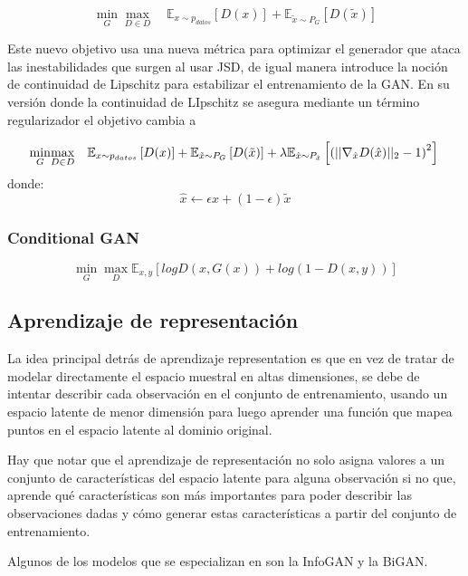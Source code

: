 \begin{equation}
	\label{eq:WGANobjective}
	\underset{G}{\min}\underset{D \in D}{\max}\quad \mathbb{E}_{x \sim  p_{datos}}\left[ D (x) \right] + \mathbb{E}_{\tilde{x}\sim P_{G}}\left[ D(\tilde{x})\right]
\end{equation}

Este nuevo objetivo usa una nueva métrica para optimizar el generador que ataca las inestabilidades que surgen al usar JSD, de igual manera introduce la noción de continuidad de Lipschitz para estabilizar el entrenamiento de la GAN. En su versión donde la continuidad de LIpschitz se asegura mediante un término regularizador el objetivo cambia a

\begin{equation}
	\underset{G}{\min}\underset{D \in D}{\max}\quad \mathbb{E}_{x \sim  p_{datos}}\left[ D (x) \right] + \mathbb{E}_{\tilde{x}\sim P_{G}}\left[ D(\tilde{x})\right] + \lambda \mathbb{E}_{\hat{x}\sim P_{\hat{x}}}\left[ \left( || \nabla_{\hat{x}}D(\hat{x})||_{2} - 1\right) ^2 \right]\\
\end{equation}
\qquad\qquad donde:
\[
	\hat{x} \leftarrow \epsilon x + (1 - \epsilon) \tilde{x}
\]

\subsubsection{Conditional GAN}

\begin{equation}
	\label{eq:CGANobjective}
	\underset{G}{\min}\underset{D}{\max} \mathbb{E}_{x,y}\left[ log D (x, G(x)) +  log (1 - D(x,y) ) \right]
\end{equation}

\subsection{Aprendizaje de representación}

La idea principal detrás de aprendizaje representation es que en vez de tratar de modelar directamente el espacio muestral en altas dimensiones, se debe de intentar describir cada observación en el conjunto de entrenamiento,  usando un espacio latente de menor dimensión para luego aprender una función que mapea puntos en el espacio latente al dominio original.

Hay que notar que el aprendizaje de representación no solo asigna valores a un conjunto de características del espacio latente para alguna observación si no que, aprende qué características son más importantes para poder describir las observaciones dadas y cómo generar estas características a partir del conjunto de entrenamiento.

Algunos de los modelos que se especializan en son la InfoGAN y la BiGAN.
